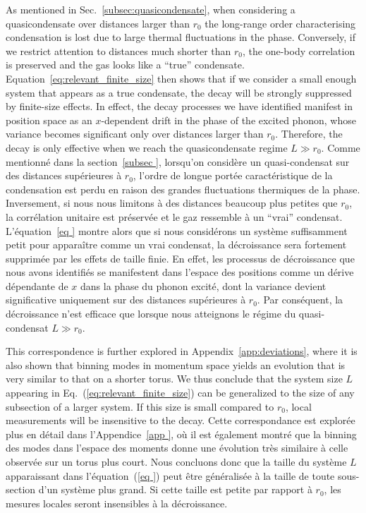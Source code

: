 \documentclass[aps,prd,notitlepage,amsfonts,amssymb,amsmath,nofootinbib,superscriptaddress,longbibliography]{revtex4-2}
\newcommand{\trad}[1]{\textcolor{tradcolor}{#1}}
\begin{document}
As mentioned in Sec.~\ref{subsec:quasicondensate}, when considering a quasicondensate over distances larger than $r_0$ the long-range order characterising condensation is lost due to large thermal fluctuations in the phase. 
Conversely, if we restrict attention to distances much shorter than $r_{0}$, the one-body correlation is preserved and the gas looks like a ``true'' condensate. Equation~\eqref{eq:relevant_finite_size} then shows that if we consider a small enough system 
that appears as a true condensate, the decay will be strongly suppressed by finite-size effects. 
In effect, the decay
processes we have identified manifest in position space
as an $x$-dependent drift in the phase of the excited phonon, whose variance becomes significant only over distances larger than $r_{0}$.
Therefore, the decay is only effective when we reach the quasicondensate regime $L \gg r_0$. 
\trad{
Comme mentionné dans la section~\ref{subsec
}, lorsqu'on considère un quasi-condensat sur des distances supérieures à $r_0$, l'ordre de longue portée caractéristique de la condensation est perdu en raison des grandes fluctuations thermiques de la phase. Inversement, si nous nous limitons à des distances beaucoup plus petites que $r_{0}$, la corrélation unitaire est préservée et le gaz ressemble à un ``vrai'' condensat. L'équation~\eqref{eq
} montre alors que si nous considérons un système suffisamment petit pour apparaître comme un vrai condensat, la décroissance sera fortement supprimée par les effets de taille finie. En effet, les processus de décroissance que nous avons identifiés se manifestent dans l'espace des positions comme un dérive dépendante de $x$ dans la phase du phonon excité, dont la variance devient significative uniquement sur des distances supérieures à $r_{0}$. Par conséquent, la décroissance n'est efficace que lorsque nous atteignons le régime du quasi-condensat $L \gg r_0$.
}

This correspondence is further explored in Appendix~\ref{app:deviations}, where it is also shown that binning modes in momentum space yields an evolution that is very similar to that on a shorter torus.  We thus conclude that the system size $L$ appearing in Eq.~(\ref{eq:relevant_finite_size}) can be generalized to the size of any subsection of a larger system.  If this size is small compared to $r_{0}$, local measurements will be insensitive to the decay.
\trad{Cette correspondance est explorée plus en détail dans l'Appendice~\ref{app
}, où il est également montré que la binning des modes dans l'espace des moments donne une évolution très similaire à celle observée sur un torus plus court. Nous concluons donc que la taille du système $L$ apparaissant dans l'équation~(\ref{eq
}) peut être généralisée à la taille de toute sous-section d'un système plus grand. Si cette taille est petite par rapport à $r_{0}$, les mesures locales seront insensibles à la décroissance.}
\end{document}

